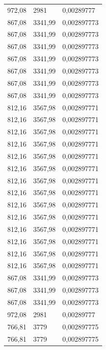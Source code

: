 \begin{center}
\begin{longtable}{|l|l|l|}
972,08            & 2981              & 0,00289777  \\
867,08            & 3341,99           & 0,002897773 \\
867,08            & 3341,99           & 0,002897773 \\
867,08            & 3341,99           & 0,002897773 \\
867,08            & 3341,99           & 0,002897773 \\
867,08            & 3341,99           & 0,002897773 \\
867,08            & 3341,99           & 0,002897773 \\
867,08            & 3341,99           & 0,002897773 \\
812,16            & 3567,98           & 0,002897771 \\
812,16            & 3567,98           & 0,002897771 \\
812,16            & 3567,98           & 0,002897771 \\
812,16            & 3567,98           & 0,002897771 \\
812,16            & 3567,98           & 0,002897771 \\
812,16            & 3567,98           & 0,002897771 \\
812,16            & 3567,98           & 0,002897771 \\
812,16            & 3567,98           & 0,002897771 \\
812,16            & 3567,98           & 0,002897771 \\
812,16            & 3567,98           & 0,002897771 \\
812,16            & 3567,98           & 0,002897771 \\
812,16            & 3567,98           & 0,002897771 \\
812,16            & 3567,98           & 0,002897771 \\
812,16            & 3567,98           & 0,002897771 \\
867,08            & 3341,99           & 0,002897773 \\
867,08            & 3341,99           & 0,002897773 \\
867,08            & 3341,99           & 0,002897773 \\
972,08            & 2981              & 0,00289777  \\
766,81            & 3779              & 0,002897775 \\
766,81            & 3779              & 0,002897775 \\

\end{longtable}
\end{center}
